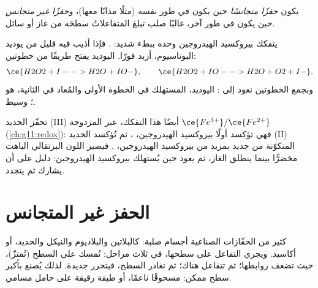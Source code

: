 \begin{definition}\label{def:g12:catalysis:homogeneous}
يكون  \emph{حفزًا متجانسًا}
حين يكون  في طور  نفسه (مثلًا
مذابًا معها)، و\emph{حفزًا غير متجانس}
حين يكون في طور آخر، غالبًا صلب تبلغ المتفاعلاتُ
سطحَه من غاز أو سائل.
\end{definition}

\begin{example}\label{ex:g12:catalysis:iodide}
يتفكك بيروكسيد الهيدروجين وحده ببطء شديد:
. فإذا أذيب فيه قليل من يوديد البوتاسيوم،
أزبد فورًا.  اليوديد يفتح طريقًا من خطوتين:
\[
  \ce{H2O2 + I- -> H2O + IO-}, \qquad
  \ce{H2O2 + IO- -> H2O + O2 + I-} .
\]
وبجمع الخطوتين نعود إلى :  اليوديد،
المستهلك في الخطوة الأولى والمُعاد في الثانية، هو ؛
  وسيط.
\end{example}


\begin{example}\label{ex:g12:catalysis:iron}
تحفّز  الحديد (III) أيضًا هذا التفكك، عبر المزدوجة
$\ce{Fe^{3+}}/\ce{Fe^{2+}}$ (\cref{ch:g11:redox}): فهي تؤكسد أولًا
بيروكسيد الهيدروجين، ، ثم تُؤكسد
 الحديد (II) المتكوّنة من جديد بمزيد من بيروكسيد الهيدروجين،
. فيصير اللون البرتقالي الباهت
 مخضرًّا بينما ينطلق الغاز، ثم يعود
حين يُستهلك بيروكسيد الهيدروجين: دليل على أن  يشارك
ثم يتجدد.
\end{example}

\section{الحفز غير المتجانس}

كثير من الحفّازات الصناعية أجسام صلبة:  كالبلاتين والبلاديوم
والنيكل والحديد، أو أكاسيد. ويجري التفاعل على سطحها،
في ثلاث مراحل: تُمسك   على السطح
(تُمتزّ)، حيث تضعف روابطها؛ ثم تتفاعل هناك؛ ثم تغادر
 السطح، فيتحرر  جديدة. لذلك يُصنع 
بأكبر سطح ممكن: مسحوقًا ناعمًا، أو طبقة
رقيقة على حامل مسامي.

